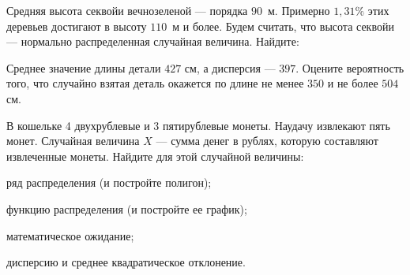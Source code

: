 \vfil

\begin{zkrPlain}{25}\noindent 
	Средняя высота секвойи вечнозеленой  — порядка {$90$~м}. Примерно $1{,}31\%$ этих деревьев достигают в высоту $110$~м и более. Будем считать, что высота секвойи — нормально распределенная случайная величина. Найдите: \par {}
 
\end{zkrPlain}

\vfil

\begin{zkrPlain}{25}\noindent 
	Среднее значение длины детали $ 427 $ см, а дисперсия --- $ 397 $. Оцените вероятность того, что случайно взятая деталь окажется по длине не менее $ 350 $ и не более $ 504 $ см.
 
\end{zkrPlain}

\newpage\setcounter{zad}{0}\setcounter{footnote}{0}



\begin{zkrPlain}{25}\noindent 
	В кошельке 4 двухрублевые и 3 пятирублевые монеты. Наудачу извлекают пять монет. Случайная величина $X$ --- сумма денег в рублях, которую составляют извлеченные монеты.  Найдите для этой случайной величины: \par \smallskip\small{ \par \zz ряд распределения (и постройте полигон); \par \zz функцию распределения (и постройте ее график); \par \zz математическое ожидание; \par \zz дисперсию и среднее квадратическое отклонение.\par \par}
 
\end{zkrPlain}

\vfil

